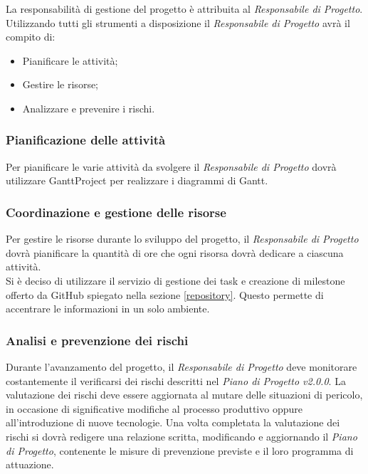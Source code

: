 La responsabilità di gestione del progetto è attribuita al \textit{Responsabile di Progetto}. \\
Utilizzando tutti gli strumenti a disposizione il \textit{Responsabile di Progetto} avrà il compito di:
\begin{itemize}
	\item Pianificare le attività;
	\item Gestire le risorse;
	\item Analizzare e prevenire i rischi.
\end{itemize}

\subsubsection{Pianificazione delle attività}
Per pianificare le varie attività da svolgere il \textit{Responsabile di Progetto} dovrà utilizzare GanttProject per realizzare i diagrammi di Gantt.

\subsubsection{Coordinazione e gestione delle risorse}
Per gestire le risorse durante lo sviluppo del progetto, il \textit{Responsabile di Progetto} dovrà pianificare la quantità di ore che ogni risorsa dovrà dedicare a ciascuna attività.\\
Si è deciso di utilizzare il servizio di gestione dei \gls{task} e creazione di \gls{milestone} offerto da \gls{GitHub} spiegato nella sezione \ref{repository}. Questo permette di accentrare le informazioni in un solo ambiente.

\subsubsection{Analisi e prevenzione dei rischi}
Durante l'avanzamento del progetto, il \textit{Responsabile di Progetto} deve monitorare costantemente il verificarsi dei rischi descritti nel \textit{Piano di Progetto v2.0.0}. La valutazione dei rischi deve essere aggiornata al mutare delle situazioni di pericolo, in occasione di significative modifiche al processo produttivo oppure all'introduzione di nuove tecnologie. Una volta completata la valutazione dei rischi si dovrà redigere una relazione scritta, modificando e aggiornando il \textit{Piano di Progetto}, contenente le misure di prevenzione previste e il loro programma di attuazione.